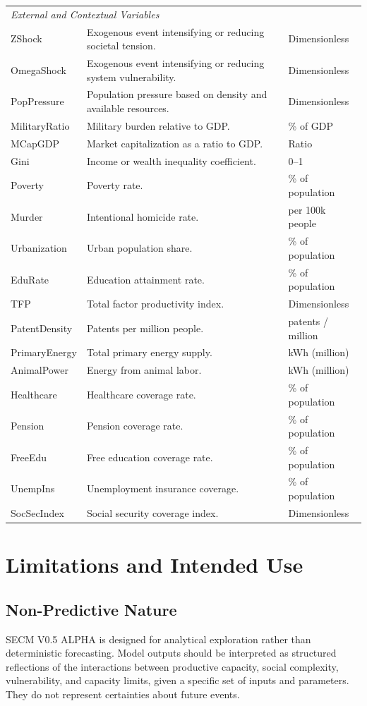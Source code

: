 \documentclass[12pt,a4paper]{article}
\begin{document}
\begin{longtable}{p{3cm} p{9cm} p{3cm}}
\multicolumn{3}{l}{\textit{External and Contextual Variables}} \\
ZShock & Exogenous event intensifying or reducing societal tension. & Dimensionless \\
OmegaShock & Exogenous event intensifying or reducing system vulnerability. & Dimensionless \\
PopPressure & Population pressure based on density and available resources. & Dimensionless \\
MilitaryRatio & Military burden relative to GDP. & \% of GDP \\
MCapGDP & Market capitalization as a ratio to GDP. & Ratio \\
Gini & Income or wealth inequality coefficient. & 0--1 \\
Poverty & Poverty rate. & \% of population \\
Murder & Intentional homicide rate. & per 100k people \\
Urbanization & Urban population share. & \% of population \\
EduRate & Education attainment rate. & \% of population \\
TFP & Total factor productivity index. & Dimensionless \\
PatentDensity & Patents per million people. & patents / million \\
PrimaryEnergy & Total primary energy supply. & kWh (million) \\
AnimalPower & Energy from animal labor. & kWh (million) \\
Healthcare & Healthcare coverage rate. & \% of population \\
Pension & Pension coverage rate. & \% of population \\
FreeEdu & Free education coverage rate. & \% of population \\
UnempIns & Unemployment insurance coverage. & \% of population \\
SocSecIndex & Social security coverage index. & Dimensionless \\

\bottomrule
\end{longtable}
\section{Limitations and Intended Use}

\subsection{Non-Predictive Nature}
SECM V0.5 ALPHA is designed for analytical exploration rather than deterministic forecasting. Model outputs should be interpreted as structured reflections of the interactions between productive capacity, social complexity, vulnerability, and capacity limits, given a specific set of inputs and parameters. They do not represent certainties about future events.
\end{document}
